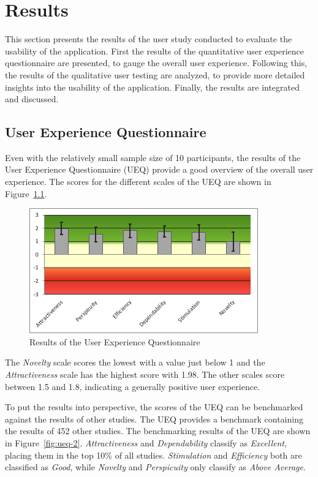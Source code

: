 %
\chapter{Results}
\label{sec:result}

This section presents the results of the user study conducted to evaluate the usability of the application.
First the results of the quantitative user experience questionnaire are presented, to gauge the overall user experience.
Following this, the results of the qualitative user testing are analyzed, to provide more detailed insights into the usability of the application.
Finally, the results are integrated and discussed.

\section{User Experience Questionnaire}
\label{sec:result:ux}

Even with the relatively small sample size of 10 participants, the results of the User Experience Questionnaire (UEQ) provide a good overview of the overall user experience.
The scores for the different scales of the UEQ are shown in Figure~\ref{fig:ueq-1}. 

\begin{figure}[htb]
	\includegraphics[width=\textwidth]{figures/ueq-1.png}
	\caption{Results of the User Experience Questionnaire}
  \label{fig:ueq-1}
\end{figure}

The \emph{Novelty} scale scores the lowest with a value just below 1 and the \emph{Attractiveness} scale has the highest score with 1.98.
The other scales score between 1.5 and 1.8, indicating a generally positive user experience.

To put the results into perspective, the scores of the UEQ can be benchmarked against the results of other studies.
The UEQ provides a benchmark containing the results of 452 other studies. 
The benchmarking results of the UEQ are shown in Figure~\ref{fig:ueq-2}.
\emph{Attractiveness} and \emph{Dependability} classify as \emph{Excellent}, placing them in the top 10\% of all studies.
\emph{Stimulation} and \emph{Efficiency} both are classified as \emph{Good}, while \emph{Novelty} and \emph{Perspicuity} only classify as \emph{Above Average}.


